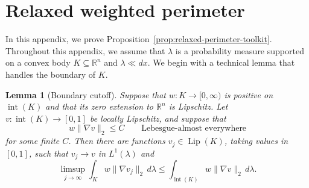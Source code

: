 \documentclass[11pt]{article}
\newtheorem{lemma}[theorem]{Lemma}
\theoremstyle{definition}
\theoremstyle{remark}
\newcommand{\R}{\mathbb R}
\newcommand{\Lip}{\operatorname{Lip}}
\begin{document}
\section{Relaxed weighted perimeter}
\label{app:relaxed-perimeter}
In this appendix, we prove Proposition~\ref{prop:relaxed-perimeter-toolkit}. Throughout this appendix, we assume that $\lambda$ is a probability measure supported on a convex body $K\subseteq\R^n$ and $\lambda\ll dx$. We begin with a technical lemma that handles the boundary of $K$.

\begin{lemma}[Boundary cutoff]\label{lem:boundary-cutoff}
Suppose that $w:K\to[0,\infty)$ is positive on $\operatorname{int}(K)$ and that its zero extension to $\R^n$ is Lipschitz.
Let $v:{\operatorname{int}(K)}\to[0,1]$ be locally Lipschitz, and suppose that
\[
 w\|\nabla v\|_2\le C
 \qquad\text{Lebesgue-almost everywhere}
\]
for some finite $C$.  Then there are functions $v_j\in\Lip(K)$, taking
values in $[0,1]$, such that $v_j\to v$ in $L^1(\lambda)$ and
\[
 \limsup_{j\to\infty}\int_Kw\|\nabla v_j\|_2\,d\lambda
 \le\int_{\operatorname{int}(K)} w\|\nabla v\|_2\,d\lambda.
\]
\end{lemma}
\end{document}
